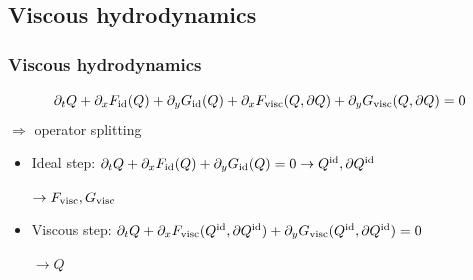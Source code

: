 \documentclass{beamer}
\begin{document}
\subsection{Viscous hydrodynamics}
\begin{frame}[noframenumbering]
\frametitle{Viscous hydrodynamics}
\begin{equation*}
\partial_t Q + \partial_x F_{\rm id}(Q)+\partial_y G_{\rm id}(Q)+\partial_x F_{\rm visc}(Q,\partial Q)+\partial_y G_{\rm visc}(Q,\partial Q) = 0
\end{equation*}
\vspace{10pt}
$\Longrightarrow$ operator splitting
\vspace{10pt}
\begin{itemize}
\setlength{\itemsep}{20pt}
\item<1-> Ideal step: $\partial_t Q + \partial_x F_{\rm id}(Q)+\partial_y G_{\rm id}(Q)=0\rightarrow Q^{\rm id},\partial Q^{\rm id}$

$\rightarrow F_{\rm visc}, G_{\rm visc}$ 

\item<1-> Viscous step: $\partial_t Q + \partial_x F_{\rm visc}(Q^{\rm id},\partial Q^{\rm id})+\partial_y G_{\rm visc}(Q^{\rm id},\partial Q^{\rm id}) = 0$ 

$\rightarrow Q$ 

\end{itemize}


\end{frame}
\end{document}
